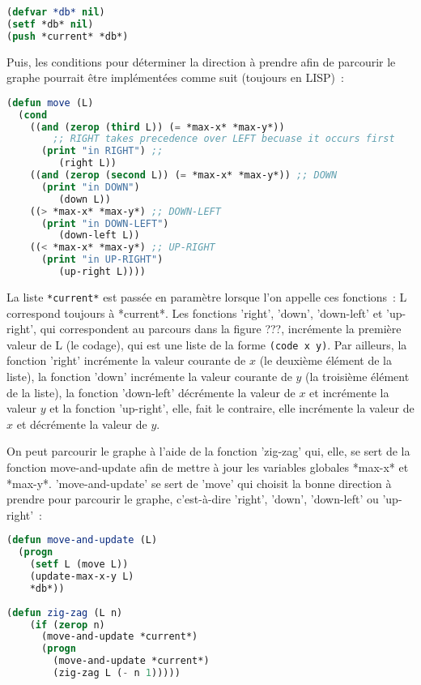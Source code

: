 \documentclass{article}
\begin{document}
\begin{lstlisting}[language=Lisp]
(defvar *db* nil) 
(setf *db* nil)
(push *current* *db*)
\end{lstlisting}

Puis, les conditions pour déterminer la direction à prendre afin de parcourir le graphe pourrait être implémentées comme suit (toujours en LISP)~:

\begin{lstlisting}[language=Lisp]
(defun move (L)
  (cond
    ((and (zerop (third L)) (= *max-x* *max-y*)) 
		;; RIGHT takes precedence over LEFT becuase it occurs first
      (print "in RIGHT") ;; 
         (right L))
    ((and (zerop (second L)) (= *max-x* *max-y*)) ;; DOWN
      (print "in DOWN") 
         (down L))
    ((> *max-x* *max-y*) ;; DOWN-LEFT
      (print "in DOWN-LEFT")  
         (down-left L))
    ((< *max-x* *max-y*) ;; UP-RIGHT
      (print "in UP-RIGHT") 
         (up-right L))))
\end{lstlisting}
 
La liste \lstinline!*current*! est passée en paramètre lorsque l'on appelle ces fonctions~: L correspond toujours à *current*. Les fonctions 'right', 'down', 'down-left' et 'up-right', qui correspondent au parcours dans la figure ???, incrémente la première valeur de L (le codage), qui est une liste de la forme \lstinline!(code x y)!. Par ailleurs, la fonction 'right' incrémente la valeur courante de $x$ (le deuxième élément de la liste), la fonction 'down' incrémente la valeur courante de $y$ (la troisième élément de la liste), la fonction 'down-left' décrémente la valeur de $x$ et incrémente la valeur $y$ et la fonction 'up-right', elle, fait le contraire, elle incrémente la valeur de $x$ et décrémente la valeur de $y$. 

On peut parcourir le graphe à l'aide de la fonction 'zig-zag' qui, elle, se sert de la fonction move-and-update afin de mettre à jour les variables globales *max-x* et *max-y*. 'move-and-update' se sert de 'move' qui choisit la bonne direction à prendre pour parcourir le graphe, c'est-à-dire 'right', 'down', 'down-left' ou 'up-right'~:

\begin{lstlisting}[language=Lisp]
(defun move-and-update (L)
  (progn
    (setf L (move L))
    (update-max-x-y L)
    *db*))
 
(defun zig-zag (L n)
    (if (zerop n) 
      (move-and-update *current*)
      (progn
        (move-and-update *current*)
        (zig-zag L (- n 1)))))
\end{lstlisting}
\end{document}
